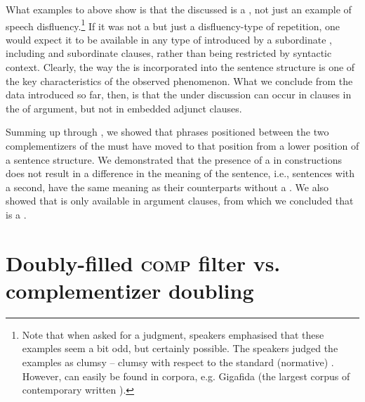 \documentclass[output=paper,colorlinks,citecolor=brown]{langsci/langscibook}
\begin{document}
\noindent What examples  to  above show is that the discussed   is a , not just an example of speech disfluency.\footnote{Note that when asked for a judgment, speakers emphasised that these examples seem a bit odd, but certainly possible. The speakers judged the examples as clumsy – clumsy with respect to the standard (normative) . However,  can easily be found in  corpora, e.g. Gigafida (the largest corpus of contemporary written ).} If it was not a  but just a disfluency-type of repetition, one would expect it to be available in any type of  introduced by a subordinate , including  and  subordinate clauses, rather than being restricted by syntactic context. Clearly, the way the  is incorporated into the sentence structure is one of the key characteristics of the observed   phenomenon. What we conclude from the data introduced so far, then, is that the   under discussion can occur in clauses in the  of argument, but not in embedded adjunct clauses.

Summing up  through , we showed that phrases positioned between the two complementizers of the  must have moved to that position from a lower position of a sentence structure. We demonstrated that the presence of a   in  constructions does not result in a difference in the meaning of the sentence, i.e., sentences with a second,   have the same meaning as their counterparts without a  . We also showed that   is only available in argument clauses, from which we concluded that   is a .

\section{Doubly-filled \textsc{comp} filter vs. complementizer doubling} \label{sec:plesnicar:s3}
\end{document}
